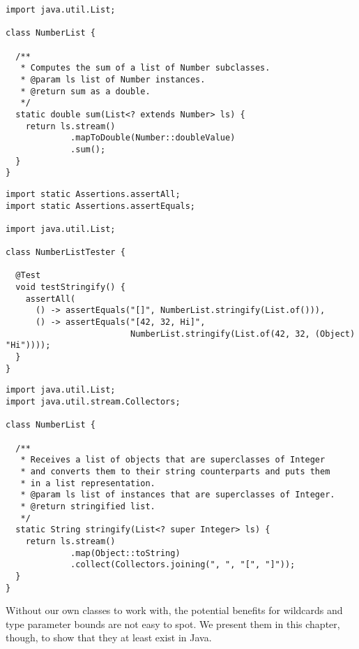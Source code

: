 \begin{cl}[]{}
\begin{lstlisting}[language=MyJava]
import java.util.List;

class NumberList {

  /**
   * Computes the sum of a list of Number subclasses.
   * @param ls list of Number instances.
   * @return sum as a double.
   */
  static double sum(List<? extends Number> ls) {
    return ls.stream()
             .mapToDouble(Number::doubleValue)
             .sum();
  }
}
\end{lstlisting}
\end{cl}


\begin{cl}[]{}
\begin{lstlisting}[language=MyJava]
import static Assertions.assertAll;
import static Assertions.assertEquals;

import java.util.List;

class NumberListTester {

  @Test
  void testStringify() {
    assertAll(
      () -> assertEquals("[]", NumberList.stringify(List.of())),
      () -> assertEquals("[42, 32, Hi]",
                         NumberList.stringify(List.of(42, 32, (Object) "Hi"))));
  }
}
\end{lstlisting}
\end{cl}

\begin{cl}[]{}
\begin{lstlisting}[language=MyJava]
import java.util.List;
import java.util.stream.Collectors;

class NumberList {

  /**
   * Receives a list of objects that are superclasses of Integer
   * and converts them to their string counterparts and puts them
   * in a list representation.
   * @param ls list of instances that are superclasses of Integer.
   * @return stringified list.
   */
  static String stringify(List<? super Integer> ls) {
    return ls.stream()
             .map(Object::toString)
             .collect(Collectors.joining(", ", "[", "]"));
  }
}
\end{lstlisting}
\end{cl}

Without our own classes to work with, the potential benefits for wildcards and type parameter bounds are not easy to spot. We present them in this chapter, though, to show that they at least exist in Java. 